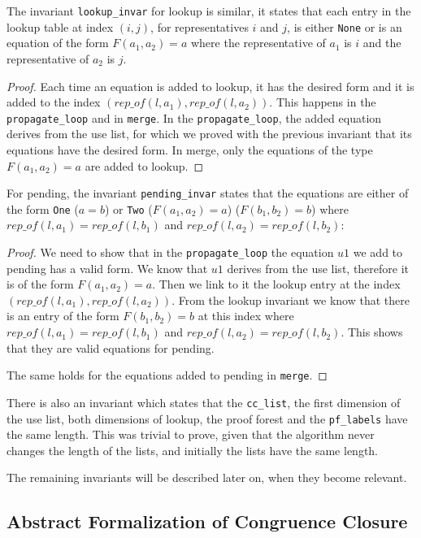 The invariant \lstinline|lookup_invar| for lookup is similar, it states that each entry in the lookup table at index $(i, j)$, for representatives $i$ and $j$, is either \lstinline{None} or is an equation of the form $F(a_1, a_2) = a$ where the representative of $a_1$ is $i$ and the representative of $a_2$  is $j$.

\begin{proof}
Each time an equation is added to lookup, it has the desired form and it is added to the index $(rep\_of(l, a_1), rep\_of(l, a_2))$. This happens in the \lstinline{propagate_loop} and in \lstinline{merge}. In the \lstinline{propagate_loop}, the added equation derives from the use list, for which we proved with the previous invariant that its equations have the desired form. In merge, only the equations of the type $F(a_1, a_2) = a$ are added to lookup.
\end{proof}

For pending, the invariant \lstinline|pending_invar| states that the equations are either of the form \lstinline{One} ($a = b$) or \lstinline{Two} ($F(a_1, a_2) = a$) ($F(b_1, b_2) = b$) where $rep\_of(l, a_1) = rep\_of(l, b_1)$ and $rep\_of(l, a_2) = rep\_of(l, b_2)$:

\begin{proof}
We need to show that in the \lstinline{propagate_loop} the equation $u1$ we add to pending has a valid form. We know that $u1$ derives from the use list, therefore it is of the form $F(a_1, a_2) = a$. Then we link to it the lookup entry at the index $(rep\_of(l, a_1), rep\_of(l, a_2))$. From the lookup invariant we know that there is an entry of the form $F(b_1, b_2) = b$ at this index where $rep\_of(l, a_1) = rep\_of(l, b_1)$ and $rep\_of(l, a_2) = rep\_of(l, b_2)$. This shows that they are valid equations for pending.

The same holds for the equations added to pending in \lstinline{merge}.
\end{proof}

There is also an invariant which states that the \lstinline{cc_list}, the first dimension of the use list, both dimensions of lookup, the proof forest and the \lstinline{pf_labels} have the same length. This was trivial to prove, given that the algorithm never changes the length of the lists, and initially the lists have the same length.

The remaining invariants will be described later on, when they become relevant.

\subsection{Abstract Formalization of Congruence Closure}
\label{subsection:abstraction}

